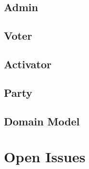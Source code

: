 \documentclass[11pt]{article}
\begin{document}
	\subsection{Admin}
		
		\newpage	
		
	\subsection{Voter}
		
		
	\subsection{Activator}
		
		\newpage
		
	\subsection{Party}
		
		
	\subsection{Domain Model}
		
		
	\section{Open Issues}
		
	
\end{document}
